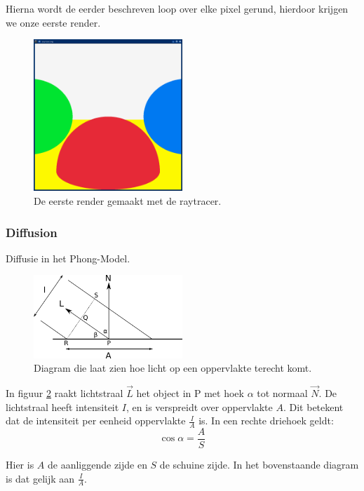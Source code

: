 \documentclass[12pt, a4paper]{article}
\begin{document}
Hierna wordt de eerder beschreven loop over elke pixel gerund, hierdoor krijgen we onze eerste render.
\begin{figure}[H]
    \centering
    \includegraphics[width=0.50\textwidth]{renders/first_raytraced.png}
    \caption{De eerste render gemaakt met de raytracer.}
    \label{fig:first_raytraced}
\end{figure}

\subsubsection{Diffusion}
Diffusie in het Phong-Model. 

\begin{figure}[H]
    \centering
    \includegraphics[width=0.50\textwidth]{diffuse-diagram.png}
    \caption{Diagram die laat zien hoe licht op een oppervlakte terecht komt.}
    \label{fig:diffuse-diagram}
\end{figure}


In figuur \ref{fig:diffuse-diagram} raakt lichtstraal $\overrightarrow{L}$ het object in P met hoek $\alpha$ tot normaal $\overrightarrow{N}$. De lichtstraal heeft intensiteit $I$, en is verspreidt over oppervlakte $A$. Dit betekent dat de intensiteit per eenheid oppervlakte $\frac{I}{A}$ is. In een rechte driehoek geldt: 
\[\cos{\alpha}=\frac{A}{S}\]

Hier is $A$ de aanliggende zijde en $S$ de schuine zijde. In het bovenstaande diagram is dat gelijk aan $\frac{I}{A}$.
\end{document}
